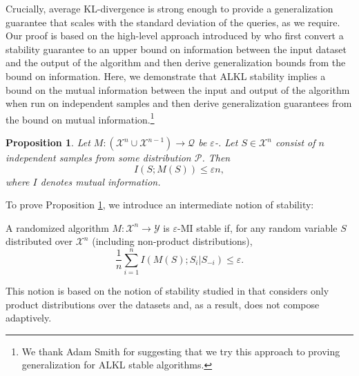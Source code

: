 \documentclass[final,12pt]{colt2018}
\newtheorem{prop}[thm]{Proposition}
\providecommand\X{\mathcal{X}}
\providecommand{\cP}{{\mathcal P}}
\begin{document}
Crucially, average KL-divergence is strong enough to provide a generalization guarantee that scales with the standard deviation of the queries, as we require. Our proof is based on the high-level approach introduced by \citet{DworkFHPRR15:arxiv} who first convert a stability guarantee to an upper bound on information between the input dataset and the output of the algorithm and then derive generalization bounds from the bound on information. Here, we demonstrate that ALKL stability implies a bound on the mutual information between the input and output of the algorithm when run on independent samples and then derive generalization guarantees from the bound on mutual information.\footnote{We thank Adam Smith for suggesting that we try this approach to proving generalization for ALKL stable algorithms.}
\begin{prop}\label{prop:gen-intro}
Let $M : \left( \mathcal{X}^n \cup \mathcal{X}^{n-1} \right) \to \mathcal{Q}$ be $\varepsilon$-\KLAS{}. Let $S \in \mathcal{X}^n$ consist of $n$ independent samples from some distribution $\cP$. Then \begin{equation}I(S;M(S)) \leq \varepsilon n,\label{eqn:MI-men}\end{equation} where $I$ denotes mutual information.
\end{prop}

To prove Proposition \ref{prop:gen-intro}, we introduce an intermediate notion of stability:
\newcommand{\MIS}{MI stable}
\begin{defn}
\label{def:mis}
A randomized algorithm $M : \X^n \to \mathcal{Y}$ is $\varepsilon$-\MIS{} if, for any random variable $S$ distributed over $\X^n$ (including non-product distributions), $$\frac{1}{n} \sum_{i=1}^n I(M(S);S_i|S_{-i}) \leq \varepsilon.$$
\end{defn}
This notion is based on the notion of stability studied in \citep{RaginskyRTWX16} that considers only product distributions over the datasets and, as a result, does not compose adaptively.
\end{document}

